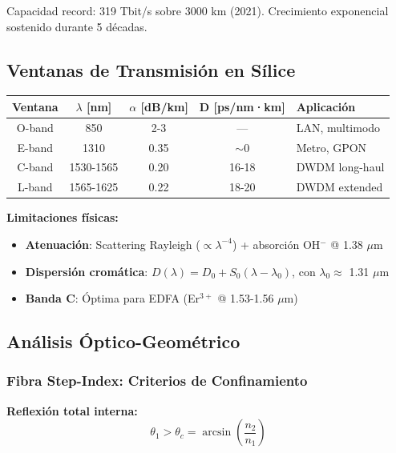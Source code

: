 \documentclass[11pt,a4paper]{article}
\begin{document}
\begin{importante}
Capacidad record: 319 Tbit/s sobre 3000 km (2021). Crecimiento exponencial sostenido durante 5 décadas.
\end{importante}

\subsection{Ventanas de Transmisión en Sílice}

\begin{table}[h]
\centering
\begin{tabular}{ccccl}
\hline
\textbf{Ventana} & \textbf{$\lambda$ [nm]} & \textbf{$\alpha$ [dB/km]} & \textbf{D [ps/nm·km]} & \textbf{Aplicación} \\
\hline
O-band & 850 & 2-3 & --- & LAN, multimodo \\
E-band & 1310 & 0.35 & $\sim$0 & Metro, GPON \\
C-band & 1530-1565 & 0.20 & 16-18 & DWDM long-haul \\
L-band & 1565-1625 & 0.22 & 18-20 & DWDM extended \\
\hline
\end{tabular}
\end{table}

\textbf{Limitaciones físicas:}
\begin{itemize}
    \item \textbf{Atenuación}: Scattering Rayleigh ($\propto \lambda^{-4}$) + absorción OH$^-$ @ 1.38 $\mu$m
    \item \textbf{Dispersión cromática}: $D(\lambda) = D_0 + S_0(\lambda - \lambda_0)$, con $\lambda_0 \approx$ 1.31 $\mu$m
    \item \textbf{Banda C}: Óptima para EDFA (Er$^{3+}$ @ 1.53-1.56 $\mu$m)
\end{itemize}

\subsection{Análisis Óptico-Geométrico}

\subsubsection{Fibra Step-Index: Criterios de Confinamiento}

\textbf{Reflexión total interna:}
\begin{equation}
    \theta_1 > \theta_c = \arcsin\left(\frac{n_2}{n_1}\right)
\end{equation}
\end{document}
